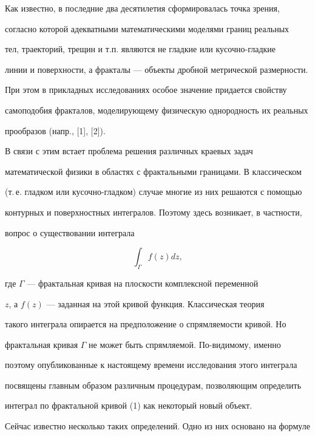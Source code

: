 Как известно, в последние два десятилетия сформировалась точка зрения,


согласно которой адекватными математическими моделями границ реальных


тел, траекторий, трещин и т.п. являются не гладкие или кусочно-гладкие


линии и поверхности, а фракталы --- объекты дробной метрической размерности.


При этом в прикладных исследованиях особое значение придается свойству


самоподобия фракталов, моделирующему физическую однородность их реальных


прообразов (напр., [1], [2]).





В связи с этим встает проблема решения различных краевых задач


математической физики в областях с фрактальными границами. В классическом


(т.\,е. гладком или кусочно-гладком) случае многие из них решаются с помощью


контурных и поверхностных интегралов. Поэтому здесь возникает, в частности,


вопрос о существовании интеграла


\begin{equation}


\int_{\Gamma}{f(z)dz},


\end{equation}


где $\Gamma$ --- фрактальная кривая на плоскости комплексной переменной


$z$, а $f(z)$ --- заданная на этой кривой функция. Классическая теория


такого интеграла опирается на предположение о спрямляемости кривой. Но


фрактальная кривая $\Gamma$ не может быть спрямляемой. По-видимому, именно


поэтому опубликованные к настоящему времени исследования этого интеграла


посвящены главным образом различным процедурам, позволяющим определить


интеграл по фрактальной кривой (1) как некоторый новый объект.





Сейчас известно несколько таких определений. Одно из них основано на формуле


